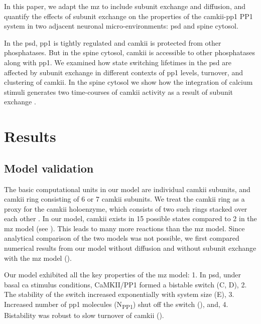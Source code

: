 \documentclass[9pt,lineno,doublespacing]{elife}
\newcommand\SUB[2]{#1\textsubscript{#2}}
\begin{document}
In this paper, we adapt the \gls{mz} \citep{miller_stability_2005} to include
subunit exchange and diffusion, and quantify the effects of subunit exchange on
the properties of the \gls{camkii}-\gls{pp1} PP1 system in two adjacent neuronal
micro-environments: \gls{psd} and spine cytosol. 

In the \gls{psd}, \gls{pp1} is tightly regulated and \gls{camkii} is protected
from other phosphatases. But in the spine cytosol, \gls{camkii} is accessible to
other phosphatases along with \gls{pp1}. We examined how state switching
lifetimes in the \gls{psd} are affected by subunit exchange in different
contexts of \gls{pp1} levels, turnover, and clustering of \gls{camkii}. In the
spine cytosol we show how the integration of calcium stimuli generates two
time-courses of \gls{camkii} activity as a result of subunit exchange
\citep{chang_camkii_2017}.

\section{Results}\label{sec:results} 

\subsection{Model validation}\label{subsec:model-validation}

The basic computational units in our model are individual \gls{camkii} subunits,
and \gls{camkii} ring consisting of 6 or 7 \gls{camkii} subunits. We treat the
\gls{camkii} ring as a proxy for the \gls{camkii} holoenzyme, which consists of
two such rings stacked over each other
\citep{woodgett_calmodulin-dependent,hoelz_crystal_2003,chao_mechanism_2011}. In
our model, \gls{camkii} exists in 15 possible states compared to 2 in the
\gls{mz} model (see ). This leads to many
more reactions than the \gls{mz} model. Since analytical comparison of the two
models was not possible, we first compared numerical results from our model
without diffusion and without subunit exchange with the \gls{mz} model
().

Our model exhibited all the key properties of the \gls{mz} model: 1. In
\gls{psd}, under basal \gls{ca}  stimulus conditions, CaMKII/PP1 formed a
bistable switch (C, D), 2. The stability of the switch increased
exponentially with system size (E), 3.  Increased number of
\gls{pp1} molecules (\SUB{N}{PP1}) shut off the switch (),
and, 4. Bistability was robust to slow turnover of \gls{camkii}
().
\end{document}
